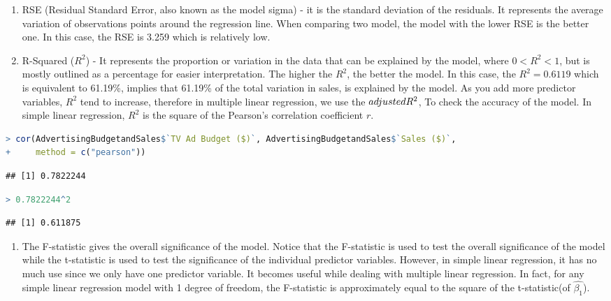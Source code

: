 \documentclass[
]{article}
\providecommand{\tightlist}{%
  \setlength{\itemsep}{0pt}\setlength{\parskip}{0pt}}
\begin{document}
\begin{enumerate}
\def\labelenumi{\arabic{enumi}.}
\item
  RSE (Residual Standard Error, also known as the model sigma) - it is
  the standard deviation of the residuals. It represents the average
  variation of observations points around the regression line. When
  comparing two model, the model with the lower RSE is the better one.
  In this case, the RSE is 3.259 which is relatively low.
\item
  R-Squared (\(R^2\)) - It represents the proportion or variation in the
  data that can be explained by the model, where \(0<R^2<1\), but is
  mostly outlined as a percentage for easier interpretation. The higher
  the \(R^2\), the better the model. In this case, the \(R^2= 0.6119\)
  which is equivalent to 61.19\%, implies that 61.19\% of the total
  variation in sales, is explained by the model. As you add more
  predictor variables, \(R^2\) tend to increase, therefore in multiple
  linear regression, we use the \(adjusted\space R^2\), To check the
  accuracy of the model. In simple linear regression, \(R^2\) is the
  square of the Pearson's correlation coefficient \(r\).
\end{enumerate}

\begin{lstlisting}[language=R]
> cor(AdvertisingBudgetandSales$`TV Ad Budget ($)`, AdvertisingBudgetandSales$`Sales ($)`,
+     method = c("pearson"))
\end{lstlisting}

\begin{lstlisting}
## [1] 0.7822244
\end{lstlisting}

\begin{lstlisting}[language=R]
> 0.7822244^2
\end{lstlisting}

\begin{lstlisting}
## [1] 0.611875
\end{lstlisting}

\begin{enumerate}
\def\labelenumi{\arabic{enumi}.}
\setcounter{enumi}{2}
\tightlist
\item
  The F-statistic gives the overall significance of the model. Notice
  that the F-statistic is used to test the overall significance of the
  model while the t-statistic is used to test the significance of the
  individual predictor variables. However, in simple linear regression,
  it has no much use since we only have one predictor variable. It
  becomes useful while dealing with multiple linear regression. In fact,
  for any simple linear regression model with 1 degree of freedom, the
  F-statistic is approximately equal to the square of the t-statistic(of
  \(\hat{\beta_1}\)).
\end{enumerate}
\end{document}
